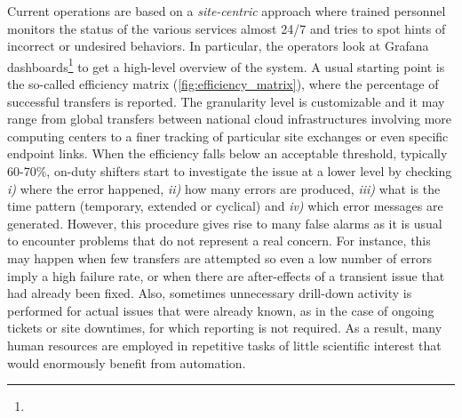 Current operations are based on a \textit{site-centric} approach where trained personnel monitors the status of the various services almost 24/7 and tries to spot hints of incorrect or undesired behaviors. In particular, the operators look at Grafana dashboards\footnote{\grafana}
 to get a high-level overview of the system. A usual starting point is the so-called efficiency matrix (\cref{fig:efficiency_matrix}), where the percentage of successful transfers is reported. The granularity level is customizable and it may range from global transfers between national cloud infrastructures involving more computing centers to a finer tracking of particular site exchanges or even specific endpoint links. 
When the efficiency falls below an acceptable threshold, typically 60-70\%, on-duty shifters start to investigate the issue at a lower level by checking \emph{i)} where the error happened, \emph{ii)} how many errors are produced, \emph{iii)} what is the time pattern (temporary, extended or cyclical) and \emph{iv)} which error messages are generated. 
However, this procedure gives rise to many false alarms as it is usual to encounter problems that do not represent a real concern. For instance, this may happen when few transfers are attempted so even a low number of errors imply a high failure rate, or when there are after-effects of a transient issue that had already been fixed. 
Also, sometimes unnecessary drill-down activity is performed for actual issues that were already known, as in the case of ongoing tickets or site downtimes, for which reporting is not required.
As a result, many human resources are employed in repetitive tasks of little scientific interest that would enormously benefit from automation. 

